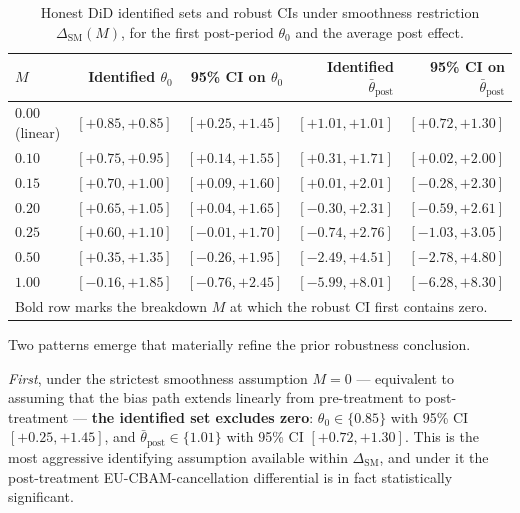 \documentclass[11pt,a4paper]{article}
\begin{document}
\begin{table}[ht]
\centering
\caption{Honest DiD identified sets and robust CIs under smoothness restriction $\Delta_{\mathrm{SM}}(M)$, for the first post-period $\theta_0$ and the average post effect.}
\label{tab:ch8-smoothness}
\begin{tabular}{lrrrr}
\toprule
$M$ & Identified $\theta_0$ & 95\% CI on $\theta_0$ & Identified $\bar\theta_{\mathrm{post}}$ & 95\% CI on $\bar\theta_{\mathrm{post}}$ \\
\midrule
$0.00$ (linear) & $[+0.85, +0.85]$ & $[+0.25, +1.45]$ & $[+1.01, +1.01]$ & $[+0.72, +1.30]$ \\
$0.10$          & $[+0.75, +0.95]$ & $[+0.14, +1.55]$ & $[+0.31, +1.71]$ & $[+0.02, +2.00]$ \\
$0.15$          & $[+0.70, +1.00]$ & $[+0.09, +1.60]$ & $[+0.01, +2.01]$ & $[-0.28, +2.30]$ \\
$0.20$          & $[+0.65, +1.05]$ & $[+0.04, +1.65]$ & $[-0.30, +2.31]$ & $[-0.59, +2.61]$ \\
$\mathbf{0.25}$ & $[+0.60, +1.10]$ & $\mathbf{[-0.01, +1.70]}$ & $[-0.74, +2.76]$ & $[-1.03, +3.05]$ \\
$0.50$          & $[+0.35, +1.35]$ & $[-0.26, +1.95]$ & $[-2.49, +4.51]$ & $[-2.78, +4.80]$ \\
$1.00$          & $[-0.16, +1.85]$ & $[-0.76, +2.45]$ & $[-5.99, +8.01]$ & $[-6.28, +8.30]$ \\
\bottomrule
\multicolumn{5}{l}{\footnotesize Bold row marks the breakdown $M$ at which the robust CI first contains zero.} \\
\end{tabular}
\end{table}

Two patterns emerge that materially refine the prior robustness conclusion.

\emph{First}, under the strictest smoothness assumption $M=0$ — equivalent to assuming that the bias path extends linearly from pre-treatment to post-treatment — \textbf{the identified set excludes zero}: $\theta_0 \in \{0.85\}$ with 95\% CI $[+0.25, +1.45]$, and $\bar\theta_{\mathrm{post}} \in \{1.01\}$ with 95\% CI $[+0.72, +1.30]$. This is the most aggressive identifying assumption available within $\Delta_{\mathrm{SM}}$, and under it the post-treatment EU-CBAM-cancellation differential is in fact statistically significant.
\end{document}
